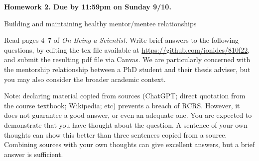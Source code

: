 \documentclass[12pt]{article}
\begin{document}
\begin{center}\bf
Homework 2. Due by 11:59pm on Sunday 9/10.

Building and maintaining healthy mentor/mentee relationships

\end{center}

Read pages 4--7 of {\em On Being a Scientist}. Write brief answers to the following questions, by editing the tex file available at \url{https://github.com/ionides/810f22}, and submit the resulting pdf file via Canvas. We are particularly concerned with the mentorship relationship between a PhD student and their thesis adviser, but you may also consider the broader academic context.

Note: declaring material copied from sources (ChatGPT; direct quotation from the course textbook; Wikipedia; etc) prevents a breach of RCRS. However, it does not guarantee a good answer, or even an adequate one. You are expected to demonstrate that you have thought about the question. A sentence of your own thoughts can show this better than three sentences copied from a source. Combining sources with your own thoughts can give excellent answers, but a brief answer is sufficient.
\end{document}

